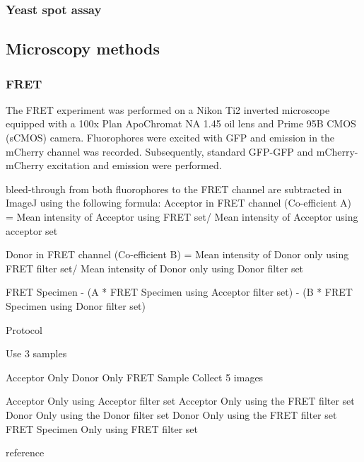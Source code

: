\subsubsection{Yeast spot assay}
\subsection{Microscopy methods}
\subsubsection{FRET}
The FRET experiment was performed on a Nikon Ti2 inverted microscope equipped with a 100x Plan ApoChromat NA 1.45 oil lens and Prime 95B CMOS (sCMOS) camera. Fluorophores were excited with GFP and emission in the mCherry channel was recorded. Subsequently, standard GFP-GFP and mCherry-mCherry excitation and emission were performed. 

bleed-through from both fluorophores to the FRET channel are subtracted in ImageJ using the following formula: 
Acceptor in FRET channel (Co-efficient A) =	Mean intensity of Acceptor using FRET set/ Mean intensity of Acceptor using acceptor set

Donor in FRET channel (Co-efficient B) = Mean intensity of Donor only using FRET filter set/ Mean intensity of Donor only using Donor filter set

FRET Specimen - (A * FRET Specimen using Acceptor filter set) - (B * FRET Specimen using Donor filter set)

Protocol

Use 3 samples

Acceptor Only
Donor Only
FRET Sample
Collect 5 images

Acceptor Only using Acceptor filter set
Acceptor Only using the FRET filter set
Donor Only using the Donor filter set
Donor Only using the FRET filter set
FRET Specimen Only using FRET filter set

reference \citep{Gordon1998QuantitativeMicroscopy}

